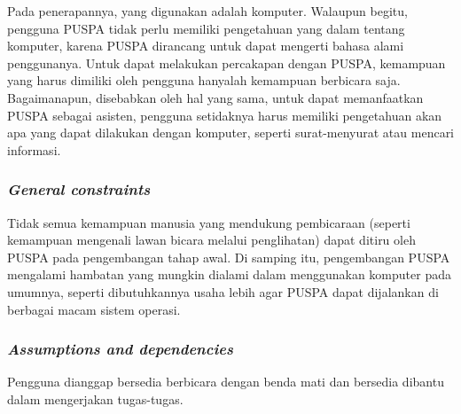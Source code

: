 Pada penerapannya, yang digunakan adalah komputer.
Walaupun begitu, pengguna PUSPA tidak perlu memiliki pengetahuan yang dalam tentang komputer, karena PUSPA dirancang untuk dapat mengerti bahasa alami penggunanya.
Untuk dapat melakukan percakapan dengan PUSPA, kemampuan yang harus dimiliki oleh pengguna hanyalah kemampuan berbicara saja.
Bagaimanapun, disebabkan oleh hal yang sama, untuk dapat memanfaatkan PUSPA sebagai asisten, pengguna setidaknya harus memiliki pengetahuan akan apa yang dapat dilakukan dengan komputer, seperti surat-menyurat atau mencari informasi.


\subsubsection*{\textit{General constraints}}

Tidak semua kemampuan manusia yang mendukung pembicaraan (seperti kemampuan mengenali lawan bicara melalui penglihatan) dapat ditiru oleh PUSPA pada pengembangan tahap awal.
Di samping itu, pengembangan PUSPA mengalami hambatan yang mungkin dialami dalam menggunakan komputer pada umumnya, seperti dibutuhkannya usaha lebih agar PUSPA dapat dijalankan di berbagai macam sistem operasi.


\subsubsection*{\textit{Assumptions and dependencies}}

Pengguna dianggap bersedia berbicara dengan benda mati dan bersedia dibantu dalam mengerjakan tugas-tugas.
